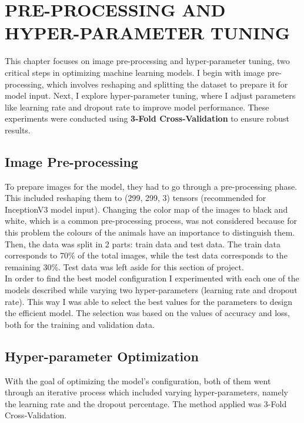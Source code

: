 \chapter{ PRE-PROCESSING AND HYPER-PARAMETER TUNING}
\label{ch:results}
This chapter focuses on image pre-processing and hyper-parameter tuning, two critical steps in optimizing machine learning models. I begin with image pre-processing, which involves reshaping and splitting the dataset to prepare it for model input. Next, I explore hyper-parameter tuning, where I adjust parameters like learning rate and dropout rate to improve model performance. These experiments were conducted using \textbf{3-Fold Cross-Validation} to ensure robust results.

\section{Image Pre-processing}
To prepare images for the model, they had to go through a pre-processing phase. This included reshaping them to (299, 299, 3) tensors (recommended for InceptionV3 model input). Changing the color map of the images to black and white, which is a common pre-processing process, was not considered because for this problem the colours of the animals have an importance to distinguish them.\\
\noindent
  Then, the data was split in 2 parts: train data and test data. The train data corresponds to 70\% of the total images, while the test data corresponds to the remaining 30\%. Test data was left aside for this section of project.\\ In order to find the best model configuration I experimented with each one of the models described while varying two hyper-parameters (learning rate and dropout rate). This way I was able to select the best values for the parameters to design the efficient model. The selection was based on the values of accuracy and loss, both for the training and validation data.\\
\clearpage
\section{Hyper-parameter Optimization}
With the goal of optimizing the model’s configuration, both of them went through an iterative process which included varying hyper-parameters, namely the learning rate  and the dropout percentage. The method applied was 3-Fold Cross-Validation.\\

